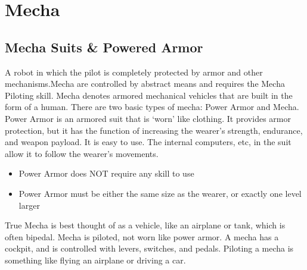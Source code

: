 \documentclass[twoside]{book}
\begin{document}
\begin{multicols}{2}
\vspace{1ex}
    
\end{multicols}
  
    

\chapter{Mecha}
    
    

\section{Mecha Suits \& Powered Armor}
      A robot in which the pilot is completely protected by
             armor and other mechanisms.Mecha are controlled by abstract
             means and requires the Mecha Piloting skill.   Mecha denotes armored mechanical vehicles that are
             built in the form of a human. There are two basic types of
             mecha: Power Armor and Mecha.   Power Armor is an armored suit that is
             `worn' like clothing. It provides armor
             protection, but it has the function of increasing the
             wearer's strength, endurance, and weapon payload. It
             is easy to use. The internal computers, etc, in the suit
             allow it to follow the wearer's movements. 
\begin{itemize}
      
  \item  Power Armor does NOT require any skill to use
               
  \item  Power Armor must be either the same size as the
               wearer, or exactly one level larger 
\end{itemize}
    True Mecha is best thought of as a vehicle, like an
             airplane or tank, which is often bipedal. Mecha is piloted,
             not worn like power armor. A mecha has a cockpit, and is
             controlled with levers, switches, and pedals. Piloting a
             mecha is something like flying an airplane or driving a car.
             
\end{document}
